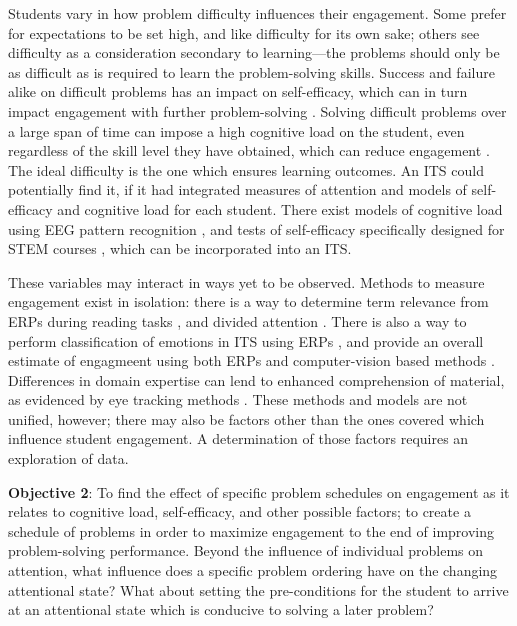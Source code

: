 \documentclass[hidelinks,11pt]{article}
\begin{document}
Students vary in how problem difficulty influences their engagement. Some
prefer for expectations to be set high, and like difficulty for its own sake;
others see difficulty as a consideration secondary to learning---the problems
should only be as difficult as is required to learn the problem-solving skills.
Success and failure alike on difficult problems has an impact on self-efficacy,
which can in turn impact engagement with further problem-solving
{\citep{mcquiggan2007}}.  Solving difficult problems over a large span of time
can impose a high cognitive load on the student, even regardless of the skill
level they have obtained, which can reduce engagement {\citep{mcquiggan2007}}.
The ideal difficulty is the one which ensures learning outcomes.  An ITS could
potentially find it, if it had integrated measures of attention and models of
self-efficacy and cognitive load for each student.  There exist models of
cognitive load using EEG pattern recognition {\citep{gevins1998, galan2012,
haapalainen2013, mcquiggan2007, stevens2013}}, and tests of self-efficacy
specifically designed for STEM courses {\citep{milner2014}}, which can be
incorporated into an ITS.

These variables may interact in ways yet to be observed.  Methods to measure
engagement exist in isolation: there is a way to determine term relevance from
ERPs during reading tasks {\citep{eugster2014}}, and divided attention
{\citep{rodrigue2015}}. There is also a way to perform classification of emotions
in ITS using ERPs {\citep{feidakis2011}}, and provide an overall estimate of
engagmeent using both ERPs {\citep{galan2012}} and computer-vision based methods
{\citep{narayanan2014}}.  Differences in domain expertise can lend to enhanced
comprehension of material, as evidenced by eye tracking methods
{\citep{gegenfurtner2011}}. These methods and models are not unified, however;
there may also be factors other than the ones covered which influence student
engagement. A determination of those factors requires an exploration of data. 

\textbf{Objective 2}: To find the effect of specific problem schedules on
engagement as it relates to cognitive load, self-efficacy, and other possible
factors; to create a schedule of problems in order to maximize engagement to
the end of improving problem-solving performance. Beyond the influence of
individual problems on attention, what influence does a specific problem
ordering have on the changing attentional state?  What about setting the
pre-conditions for the student to arrive at an attentional state which is
conducive to solving a later problem? 
\end{document}
